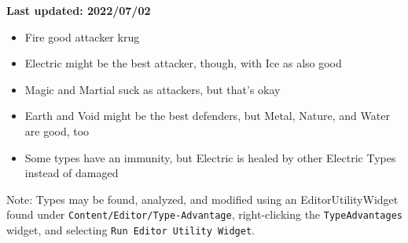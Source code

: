 

\textbf{\color{red}Last updated: 2022/07/02}

\begin{tldr}
	\begin{itemize}
		\item{Fire good attacker krug}
		\item{Electric might be the best attacker, though, with Ice as also good}
		\item{Magic and Martial suck as attackers, but that's okay}
		\item{Earth and Void might be the best defenders, but Metal, Nature, and Water are good, too}
		\item{Some types have an immunity, but Electric is healed by other Electric Types instead of damaged}
	\end{itemize}
	Note: Types may be found, analyzed, and modified using an EditorUtilityWidget found under \texttt{Content/Editor/Type-Advantage}, right-clicking the \texttt{TypeAdvantages} widget, and selecting \texttt{Run Editor Utility Widget}.
\end{tldr}

\newpage


